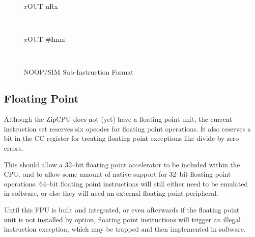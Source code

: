 \documentclass{gqtekspec}
\begin{document}
\begin{figure}
\begin{center}
\begin{bytefield}[endianness=big]{32}
\begin{leftwordgroup}{$x$OUT uRx}
		\end{leftwordgroup} \\
\begin{leftwordgroup}{$x$OUT \#Imm}
		\end{leftwordgroup} \\
\end{bytefield}
\caption{NOOP/SIM Sub-Instruction Format}\label{fig:iset-simop}
\end{center}\end{figure}
\subsection{Floating Point}
Although the ZipCPU does not (yet) have a floating point unit, the current
instruction set reserves six opcodes for floating point operations.  It also
reserves a bit in the CC register for treating floating point exceptions like
divide by zero errors.

This should allow a 32--bit floating point accelerator to be included within
the CPU, and to allow some amount of native support for 32--bit floating point
operations.  64--bit floating point instructions will still either need to be
emulated in software, or else they will need an external floating point
peripheral.

Until this FPU is built and integrated, or even afterwards if the floating
point unit is not installed by option, floating point instructions will
trigger an illegal instruction exception, which may be trapped and then
implemented in software.
\end{document}
